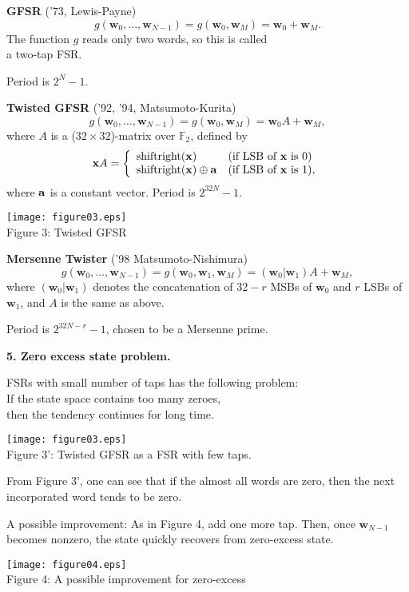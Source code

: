 \documentclass[a4j,12pt,landscape]{jarticle}
\def\F2{{\mathbb F}_2}
\def\bx{{{\mathbf x}}}
\def\bw{{{\mathbf w}}}
\begin{document}
{{\bf GFSR} ('73, Lewis-Payne)
$$
g(\bw_0,\ldots,\bw_{N-1}) = g(\bw_0, \bw_M) = \bw_0 + \bw_M.
$$
The function $g$ reads only two words, so this is called \\
a two-tap FSR.

Period is $2^N-1$.

\newpage
{\bf Twisted GFSR} ('92, '94, Matsumoto-Kurita)
$$
g(\bw_0,\ldots,\bw_{N-1}) = g(\bw_0, \bw_M) = \bw_0A + \bw_M,
$$
where $A$ is a ($32\times 32$)-matrix over $\F2$, defined by
$$
\bx A = 
\left\{\begin{array}{ll}
  \mbox{shiftright}({\bf x}) & (\mbox{if LSB of $\bx$ is 0}) \\
  \mbox{shiftright}({\bf x})\oplus{\bf a} & 
  (\mbox{if LSB of $\bx$ is 1}),
\end{array}\right.
$$
where ${\bf a}$ is a constant vector.
Period is $2^{32N}-1$. 
\begin{center}
\texttt{[image: figure03.eps]}
\\
Figure 3: Twisted GFSR
\end{center}
\newpage
{\bf Mersenne Twister} ('98 Matsumoto-Nishimura)
$$
g(\bw_0,\ldots,\bw_{N-1}) = g(\bw_0, \bw_1, \bw_M) = (\bw_0|\bw_1)A + \bw_M,
$$
where $(\bw_0|\bw_1)$ denotes
the concatenation of $32-r$ MSBs of $\bw_0$ and $r$ LSBs of $\bw_1$,
and $A$ is the same as above.

Period is $2^{32N-r}-1$, chosen to be a Mersenne prime.

\newpage
\noindent
{\bf 5. Zero excess state problem.}

FSRs with small number of taps has the following problem: \\
If the state space contains too many zeroes, \\
then the tendency continues for long time.
\begin{center}
\texttt{[image: figure03.eps]}
\\
\vskip -5mm
Figure 3': Twisted GFSR as a FSR with few taps.
\end{center}
 From Figure 3', one can see that if the almost 
all words are zero, then the next incorporated word
tends to be zero.



\newpage
A possible improvement: 
As in Figure 4, add one more tap.
Then, once $\bw_{N-1}$ becomes nonzero, the state
quickly recovers from zero-excess state.

\begin{center}
\texttt{[image: figure04.eps]}
\\
Figure 4: A possible improvement for zero-excess
\end{center}

}
\end{document}
